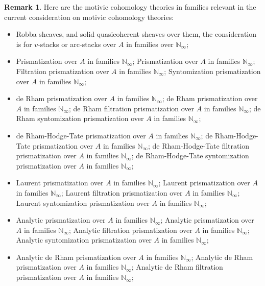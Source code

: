 \documentclass[12pt]{article}
\theoremstyle{definition}
\newtheorem{remark}{Remark}
\begin{document}
\begin{remark}
Here are the motivic cohomology theories in families relevant in the current consideration on motivic cohomology theories:
\begin{itemize}\setlength{\itemsep}{-0.1cm}
\item[1] Robba sheaves, and solid quasicoherent sheaves over them, the consideration is for $v$-stacks or arc-stacks over $A$ in families over $\mathbb{N}_\infty$;
\item[2] Prismatization over $A$ in families $\mathbb{N}_\infty$;
\subitem[2I] Prismatization over $A$ in families $\mathbb{N}_\infty$;
\subitem[2II] Filtration prismatization over $A$ in families $\mathbb{N}_\infty$;
\subitem[2III] Syntomization prismatization over $A$ in families $\mathbb{N}_\infty$;
\item[3] de Rham prismatization over $A$ in families $\mathbb{N}_\infty$;
\subitem[3I] de Rham prismatization over $A$ in families $\mathbb{N}_\infty$;
\subitem[3II] de Rham filtration prismatization over $A$ in families $\mathbb{N}_\infty$;
\subitem[3III] de Rham syntomization prismatization over $A$ in families $\mathbb{N}_\infty$;
\item[4] de Rham-Hodge-Tate prismatization over $A$ in families $\mathbb{N}_\infty$;
\subitem[4I] de Rham-Hodge-Tate prismatization over $A$ in families $\mathbb{N}_\infty$;
\subitem[4II] de Rham-Hodge-Tate filtration prismatization over $A$ in families $\mathbb{N}_\infty$;
\subitem[4III] de Rham-Hodge-Tate syntomization prismatization over $A$ in families $\mathbb{N}_\infty$;
\item[5] Laurent prismatization over $A$ in families $\mathbb{N}_\infty$;
\subitem[5I] Laurent prismatization over $A$ in families $\mathbb{N}_\infty$;
\subitem[5II] Laurent filtration prismatization over $A$ in families $\mathbb{N}_\infty$;
\subitem[5III] Laurent syntomization prismatization over $A$ in families $\mathbb{N}_\infty$;
\item[6] Analytic prismatization over $A$ in families $\mathbb{N}_\infty$;
\subitem[6I] Analytic prismatization over $A$ in families $\mathbb{N}_\infty$;
\subitem[6II] Analytic filtration prismatization over $A$ in families $\mathbb{N}_\infty$;
\subitem[6III] Analytic syntomization prismatization over $A$ in families $\mathbb{N}_\infty$;
\item[7] Analytic de Rham prismatization over $A$ in families $\mathbb{N}_\infty$;
\subitem[7I] Analytic de Rham prismatization over $A$ in families $\mathbb{N}_\infty$;
\subitem[7II] Analytic de Rham filtration prismatization over $A$ in families $\mathbb{N}_\infty$;

\end{itemize}
\end{remark}
\end{document}
